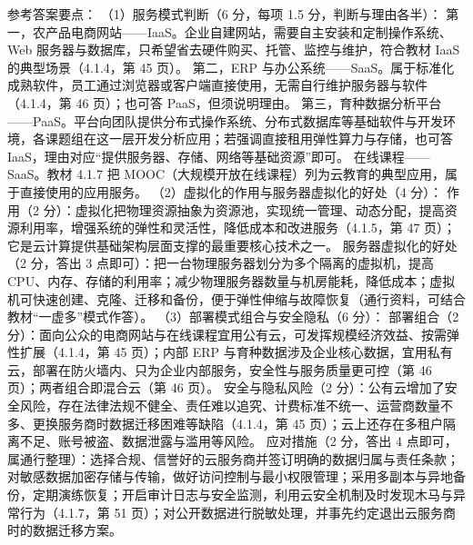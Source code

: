 \documentclass[a4paper,11pt]{article}
\begin{document}
\q 参考答案要点：
（1）服务模式判断（6 分，每项 1.5 分，判断与理由各半）：
第一，农产品电商网站——IaaS。企业自建网站，需要自主安装和定制操作系统、Web 服务器与数据库，只希望省去硬件购买、托管、监控与维护，符合教材 IaaS 的典型场景（4.1.4，第 45 页）。
第二，ERP 与办公系统——SaaS。属于标准化成熟软件，员工通过浏览器或客户端直接使用，无需自行维护服务器与软件（4.1.4，第 46 页）；也可答 PaaS，但须说明理由。
第三，育种数据分析平台——PaaS。平台向团队提供分布式操作系统、分布式数据库等基础软件与开发环境，各课题组在这一层开发分析应用；若强调直接租用弹性算力与存储，也可答 IaaS，理由对应“提供服务器、存储、网络等基础资源”即可。
在线课程——SaaS。教材 4.1.7 把 MOOC（大规模开放在线课程）列为云教育的典型应用，属于直接使用的应用服务。
（2）虚拟化的作用与服务器虚拟化的好处（4 分）：
作用（2 分）：虚拟化把物理资源抽象为资源池，实现统一管理、动态分配，提高资源利用率，增强系统的弹性和灵活性，降低成本和改进服务（4.1.5，第 47 页）；它是云计算提供基础架构层面支撑的最重要核心技术之一。
服务器虚拟化的好处（2 分，答出 3 点即可）：把一台物理服务器划分为多个隔离的虚拟机，提高 CPU、内存、存储的利用率；减少物理服务器数量与机房能耗，降低成本；虚拟机可快速创建、克隆、迁移和备份，便于弹性伸缩与故障恢复（通行资料，可结合教材“一虚多”模式作答）。
（3）部署模式组合与安全隐私（6 分）：
部署组合（2 分）：面向公众的电商网站与在线课程宜用公有云，可发挥规模经济效益、按需弹性扩展（4.1.4，第 45 页）；内部 ERP 与育种数据涉及企业核心数据，宜用私有云，部署在防火墙内、只为企业内部服务，安全性与服务质量更可控（第 46 页）；两者组合即混合云（第 46 页）。
安全与隐私风险（2 分）：公有云增加了安全风险，存在法律法规不健全、责任难以追究、计费标准不统一、运营商数量不多、更换服务商时数据迁移困难等缺陷（4.1.4，第 45 页）；云上还存在多租户隔离不足、账号被盗、数据泄露与滥用等风险。
应对措施（2 分，答出 4 点即可，属通行整理）：选择合规、信誉好的云服务商并签订明确的数据归属与责任条款；对敏感数据加密存储与传输，做好访问控制与最小权限管理；采用多副本与异地备份，定期演练恢复；开启审计日志与安全监测，利用云安全机制及时发现木马与异常行为（4.1.7，第 51 页）；对公开数据进行脱敏处理，并事先约定退出云服务商时的数据迁移方案。
\end{document}

